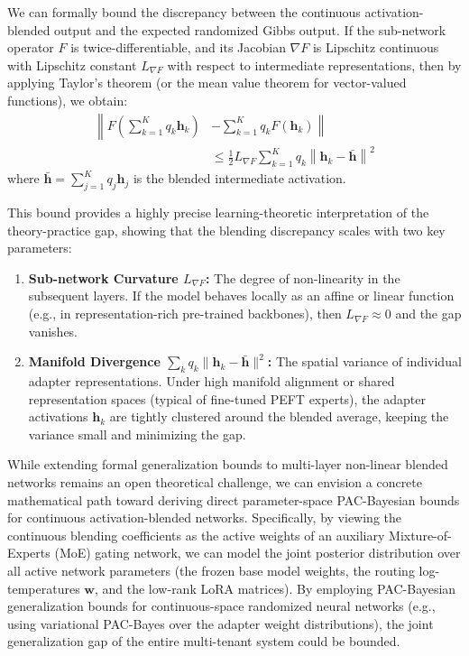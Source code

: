 We can formally bound the discrepancy between the continuous activation-blended output and the expected randomized Gibbs output. If the sub-network operator $F$ is twice-differentiable, and its Jacobian $\nabla F$ is Lipschitz continuous with Lipschitz constant $L_{\nabla F}$ with respect to intermediate representations, then by applying Taylor's theorem (or the mean value theorem for vector-valued functions), we obtain:
\begin{align}
    \left\| F\left( \sum_{k=1}^K q_k \mathbf{h}_k \right) \right. &- \left. \sum_{k=1}^K q_k F(\mathbf{h}_k) \right\| \nonumber \\
    &\le \frac{1}{2} L_{\nabla F} \sum_{k=1}^K q_k \left\| \mathbf{h}_k - \bar{\mathbf{h}} \right\|^2
\end{align}
where $\bar{\mathbf{h}} = \sum_{j=1}^K q_j \mathbf{h}_j$ is the blended intermediate activation.

This bound provides a highly precise learning-theoretic interpretation of the theory-practice gap, showing that the blending discrepancy scales with two key parameters:
\begin{enumerate}
    \item \textbf{Sub-network Curvature $L_{\nabla F}$:} The degree of non-linearity in the subsequent layers. If the model behaves locally as an affine or linear function (e.g., in representation-rich pre-trained backbones), then $L_{\nabla F} \approx 0$ and the gap vanishes.
    \item \textbf{Manifold Divergence $\sum_k q_k \|\mathbf{h}_k - \bar{\mathbf{h}}\|^2$:} The spatial variance of individual adapter representations. Under high manifold alignment or shared representation spaces (typical of fine-tuned PEFT experts), the adapter activations $\mathbf{h}_k$ are tightly clustered around the blended average, keeping the variance small and minimizing the gap.
\end{enumerate}

While extending formal generalization bounds to multi-layer non-linear blended networks remains an open theoretical challenge, we can envision a concrete mathematical path toward deriving direct parameter-space PAC-Bayesian bounds for continuous activation-blended networks. Specifically, by viewing the continuous blending coefficients as the active weights of an auxiliary Mixture-of-Experts (MoE) gating network, we can model the joint posterior distribution over all active network parameters (the frozen base model weights, the routing log-temperatures $\mathbf{w}$, and the low-rank LoRA matrices). By employing PAC-Bayesian generalization bounds for continuous-space randomized neural networks (e.g., using variational PAC-Bayes over the adapter weight distributions), the joint generalization gap of the entire multi-tenant system could be bounded. 

